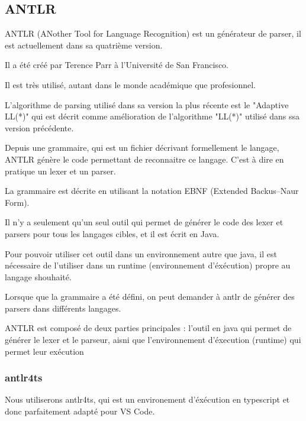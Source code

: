 \documentclass[
    iict, %
    il, %
]{heig-tb}
\begin{document}
\subsection{ANTLR}

ANTLR (ANother Tool for Language Recognition) est un générateur de parser, il est actuellement dans sa quatrième version.

Il a été créé par Terence Parr à l'Université de San Francisco.

Il est très utilisé, autant dans le monde académique que profesionnel.

L'algorithme de parsing utilisé dans sa version la plus récente est le "Adaptive LL(*)" qui est décrit comme amélioration de l'algorithme
"LL(*)" utilisé dans ssa version précédente.


Depuis une grammaire, qui est un fichier décrivant formellement le langage, ANTLR génère le code permettant de reconnaitre ce langage.
C'est à dire en pratique un lexer et un parser. %

La grammaire est décrite en utilisant la notation EBNF (Extended Backus–Naur Form).

Il n'y a seulement qu'un seul outil qui permet de générer le code des lexer et parsers pour tous les langages cibles, et il est écrit en Java.

Pour pouvoir utiliser cet outil dans un environnement autre que java, il est nécessaire de l'utiliser dans un runtime (environnement d'éxécution) propre au langage shouhaité.

Lorsque que la grammaire a été défini, on peut demander à antlr de générer des parsers dans différents langages.

ANTLR est composé de deux parties principales : l'outil en java qui permet de générer le lexer et le parseur, aisni que l'environnement d'éxecution (runtime) qui permet leur exécution


\subsubsection{antlr4ts}
Nous utiliserons antlr4ts, qui est un environement d'éxécution en typescript et donc parfaitement adapté pour VS Code.
\end{document}
